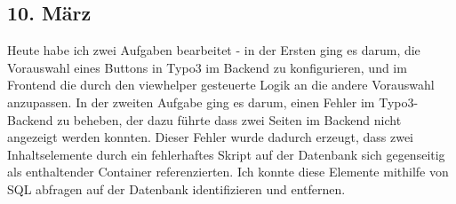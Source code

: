 \subsection{10. März}
Heute habe ich zwei Aufgaben bearbeitet - in der Ersten ging es darum, die Vorauswahl eines Buttons in Typo3 im Backend zu konfigurieren, und im Frontend die durch den viewhelper gesteuerte Logik an die andere Vorauswahl anzupassen. In der zweiten Aufgabe ging es darum, einen Fehler im Typo3-Backend zu beheben, der dazu führte dass zwei Seiten im Backend nicht angezeigt werden konnten. Dieser Fehler wurde dadurch erzeugt, dass zwei Inhaltselemente durch ein fehlerhaftes Skript auf der Datenbank sich gegenseitig als enthaltender Container referenzierten. Ich konnte diese Elemente mithilfe von SQL abfragen auf der Datenbank identifizieren und entfernen.